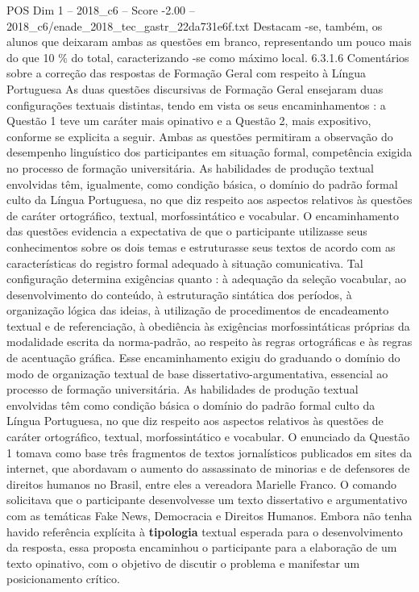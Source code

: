 \begin{textsample}{POS Dim 1 – 2018\_c6 – Score -2.00 – 2018\_c6/enade\_2018\_tec\_gastr\_22da731e6f.txt}
Destacam -se, também, os alunos que deixaram ambas as questões em branco, representando um pouco mais do que 10 \% do total, caracterizando -se como máximo local. 6.3.1.6 Comentários sobre a correção das respostas de Formação Geral com respeito à Língua Portuguesa As duas questões discursivas de Formação Geral ensejaram duas configurações textuais distintas, tendo em vista os seus encaminhamentos : a Questão 1 teve um caráter mais opinativo e a Questão 2, mais expositivo, conforme se explicita a seguir.
Ambas as questões permitiram a observação do desempenho linguístico dos participantes em situação formal, competência exigida no processo de formação universitária.
As habilidades de produção textual envolvidas têm, igualmente, como condição básica, o domínio do padrão formal culto da Língua Portuguesa, no que diz respeito aos aspectos relativos às questões de caráter ortográfico, textual, morfossintático e vocabular.
O encaminhamento das questões evidencia a expectativa de que o participante utilizasse seus conhecimentos sobre os dois temas e estruturasse seus textos de acordo com as características do registro formal adequado à situação comunicativa.
Tal configuração determina exigências quanto : à adequação da seleção vocabular, ao desenvolvimento do conteúdo, à estruturação sintática dos períodos, à organização lógica das ideias, à utilização de procedimentos de encadeamento textual e de referenciação, à obediência às exigências morfossintáticas próprias da modalidade escrita da norma-padrão, ao respeito às regras ortográficas e às regras de acentuação gráfica.
Esse encaminhamento exigiu do graduando o domínio do modo de organização textual de base dissertativo-argumentativa, essencial ao processo de formação universitária.
As habilidades de produção textual envolvidas têm como condição básica o domínio do padrão formal culto da Língua Portuguesa, no que diz respeito aos aspectos relativos às questões de caráter ortográfico, textual, morfossintático e vocabular.
O enunciado da Questão 1 tomava como base três fragmentos de textos jornalísticos publicados em sites da internet, que abordavam o aumento do assassinato de minorias e de defensores de direitos humanos no Brasil, entre eles a vereadora Marielle Franco.
O comando solicitava que o participante desenvolvesse um texto dissertativo e argumentativo com as temáticas Fake News, Democracia e Direitos Humanos.
Embora não tenha havido referência explícita à \textbf{tipologia} textual esperada para o desenvolvimento da resposta, essa proposta encaminhou o participante para a elaboração de um texto opinativo, com o objetivo de discutir o problema e manifestar um posicionamento crítico.

\end{textsample}
